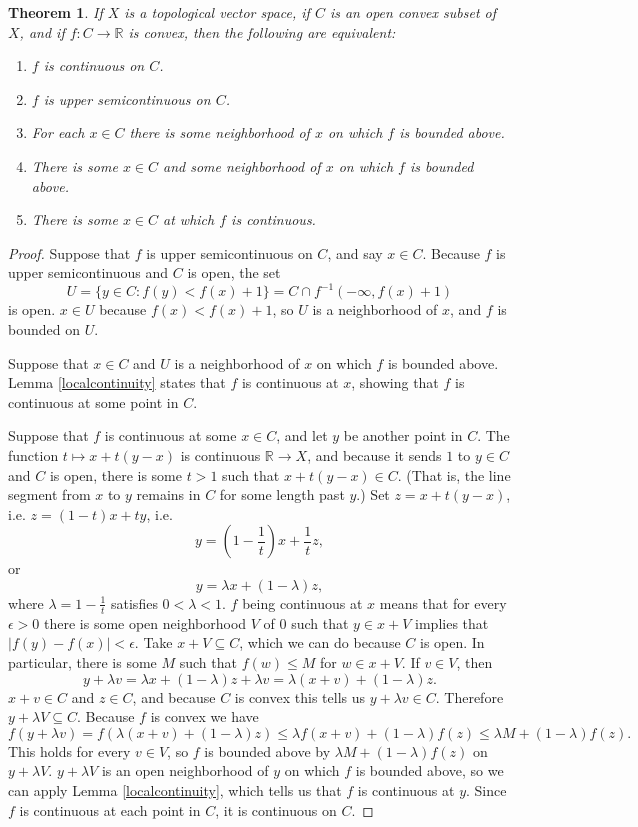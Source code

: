\documentclass{article}
\newtheorem{theorem}{Theorem}
\theoremstyle{definition}
\begin{document}
\begin{theorem}
If $X$ is a topological vector space, if $C$ is an open convex subset of $X$, and if $f:C \to \mathbb{R}$ is convex, then the following are equivalent:
\begin{enumerate}
\item $f$ is continuous on $C$.
\item $f$ is upper semicontinuous on $C$.
\item For each $x \in C$ there is some neighborhood of $x$ on which $f$ is bounded above.
\item There is some $x \in C$ and some neighborhood of $x$ on which $f$ is bounded above.
\item There is some $x \in C$ at which $f$ is continuous.
\end{enumerate}
\end{theorem}
\begin{proof}
Suppose that $f$ is upper semicontinuous on $C$, and say $x \in C$. Because $f$ is upper semicontinuous and $C$ is open, the set
\[
U=\{y \in C: f(y)<f(x)+1\} = C \cap f^{-1}(-\infty,f(x)+1)
\]
is open. $x \in U$ because $f(x)<f(x)+1$, so $U$ is a neighborhood of $x$, and $f$ is bounded on $U$.

Suppose that $x \in C$ and $U$ is a neighborhood of $x$ on which $f$ is bounded above. 
Lemma \ref{localcontinuity} states that $f$ is continuous at $x$, showing that $f$ is continuous at some point in $C$.

Suppose that $f$ is continuous at some $x \in C$, and let $y$ be another point in $C$. The function $t \mapsto x+t(y-x)$ is continuous
$\mathbb{R} \to X$, and because it sends $1$ to $y \in C$ and $C$ is open,
there is some $t>1$ such that $x+t(y-x) \in C$. (That is, the line segment from $x$ to $y$ remains in $C$ for some length past $y$.)
Set $z=x+t(y-x)$,
i.e. $z=(1-t)x+ty$, 
i.e.
\[
y=\left(1-\frac{1}{t} \right)x+\frac{1}{t}z,
\]
or
\[
y= \lambda x + (1-\lambda)z,
\]
where $\lambda=1-\frac{1}{t}$ satisfies $0<\lambda<1$.
$f$ being continuous at $x$ means that for every $\epsilon>0$ there is some open neighborhood $V$ of $0$ such that $y \in x+V$
implies that $|f(y)-f(x)|<\epsilon$. Take $x+V \subseteq C$, which we can do because $C$ is open. In particular, 
there is some $M$ such that  $f(w) \leq M$ for $w \in x+V$.
If $v \in V$, then 
\[
y+\lambda v = \lambda x +(1-\lambda)z + \lambda v = \lambda (x+v) + (1-\lambda)z.
\]
$x+v \in C$ and $z \in C$, and because $C$ is convex this tells us $y+\lambda v \in C$. Therefore
$y + \lambda V \subseteq C$. 
Because $f$ is convex we have
\[
f(y+\lambda v) = f( \lambda (x+v) + (1-\lambda)z ) \leq \lambda f(x+v) + (1-\lambda) f(z) \leq
\lambda M + (1-\lambda) f(z).
\]
This holds for every $v \in V$, so $f$ is bounded above  by $\lambda M + (1-\lambda)f(z)$ on $y+\lambda V$.
$y+\lambda V$ is an open neighborhood of $y$ on which $f$ is bounded above, so we can apply 
 Lemma \ref{localcontinuity}, which tells us that $f$ is continuous at $y$. Since $f$ is continuous at each point in $C$, it is continuous on $C$.
\end{proof}
\end{document}
